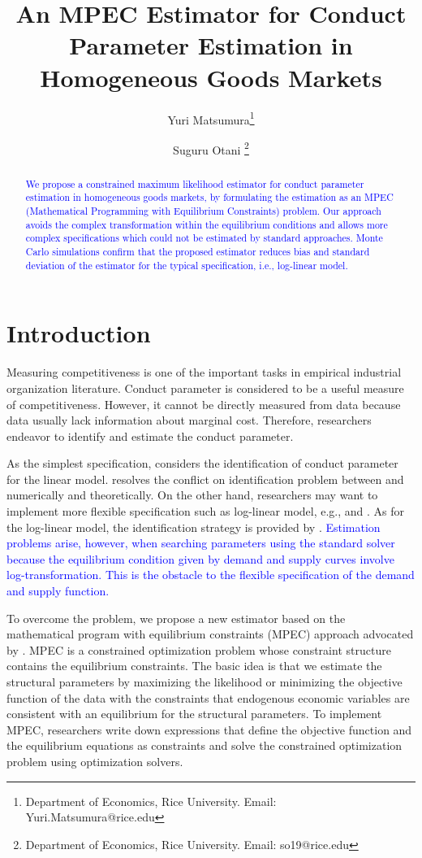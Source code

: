 \documentclass[11pt, a4paper]{article}
\title{An MPEC Estimator for Conduct Parameter Estimation in Homogeneous Goods Markets}
\author{Yuri Matsumura\thanks{Department of Economics, Rice University. Email: Yuri.Matsumura@rice.edu} \and Suguru Otani \thanks{Department of Economics, Rice University. Email: so19@rice.edu
}}
\begin{document}
\maketitle
\begin{abstract}
    \textcolor{blue}{We propose a constrained maximum likelihood estimator for conduct parameter estimation in homogeneous goods markets, by formulating the estimation as an MPEC (Mathematical Programming with Equilibrium Constraints) problem. Our approach avoids the complex transformation within the equilibrium conditions and allows more complex specifications which could not be estimated by standard approaches. Monte Carlo simulations confirm that the proposed estimator reduces bias and standard deviation of the estimator for the typical specification, i.e., log-linear model.%
    }
\end{abstract}


\section{Introduction}
Measuring competitiveness is one of the important tasks in empirical industrial organization literature.
Conduct parameter is considered to be a useful measure of competitiveness. 
However, it cannot be directly measured from data because data usually lack information about marginal cost.
Therefore, researchers endeavor to identify and estimate the conduct parameter.

As the simplest specification, \citet{bresnahan1982oligopoly} considers the identification of conduct parameter for the linear model. \cite{matsumura2023revisiting} resolves the conflict on identification problem between \cite{bresnahan1982oligopoly} and \cite{perloff2012collinearity} numerically and theoretically. On the other hand, researchers may want to implement more flexible specification such as log-linear model, e.g., \cite{okazaki2022excess} and \cite{merel2009measuring}. As for the log-linear model, the identification strategy is provided by \citet{lau1982identifying}. 
\textcolor{blue}{Estimation problems arise, however, when searching parameters using the standard solver because the equilibrium condition given by demand and supply curves involve log-transformation. This is the obstacle to the flexible specification of the demand and supply function.}


To overcome the problem, we propose a new estimator based on the mathematical program with equilibrium constraints (MPEC) approach advocated by \cite{su2012constrained}. MPEC is a constrained optimization problem whose constraint structure contains the equilibrium constraints. The basic idea is that we estimate the structural parameters by maximizing the likelihood or minimizing the objective function of the data with the constraints that endogenous economic variables are consistent with an equilibrium for the structural parameters. To implement MPEC, researchers write down expressions that define the objective function and the equilibrium equations as constraints and solve the constrained optimization problem using optimization solvers. 
\end{document}
